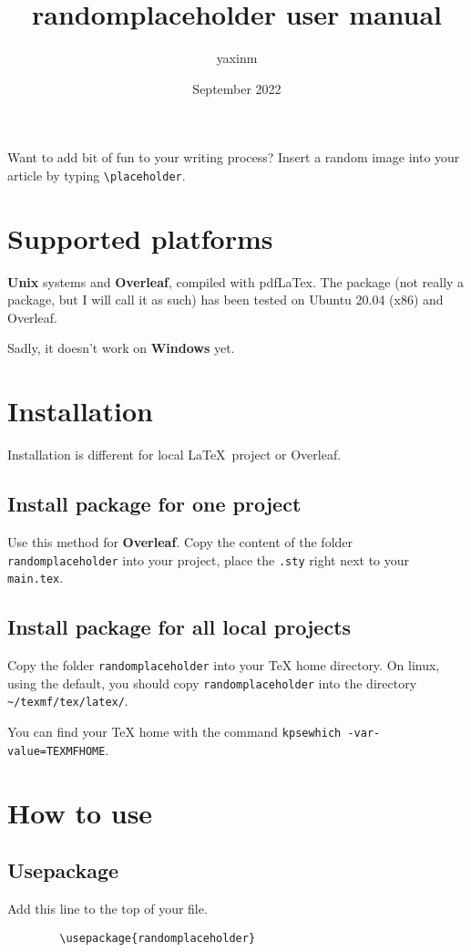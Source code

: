 \documentclass[12pt]{article}
\title{randomplaceholder user manual}
\author{yaxinm}
\date{September 2022}
\begin{document}
    \maketitle
    Want to add bit of fun to your writing process?
    Insert a random image into your article by typing \lstinline{\placeholder}. 
    \section{Supported platforms}
    \textbf{Unix} systems and \textbf{Overleaf}, compiled with pdfLaTex. 
    The package (not really a package, but I will call it as such) 
    has been tested on Ubuntu 20.04 (x86) and Overleaf.

    Sadly, it doesn't work on \textbf{Windows} yet.

    \section{Installation}
    Installation is different for local \LaTeX~project or Overleaf.

    \subsection{Install package for one project}
    Use this method for \textbf{Overleaf}.
    Copy the content of the folder \lstinline{randomplaceholder} into your project, place the \lstinline{.sty} right next to your \lstinline{main.tex}. 
    
    \subsection{Install package for all local projects}
    Copy the folder \lstinline{randomplaceholder} into your TeX home directory. On linux, using the default, you should copy \lstinline{randomplaceholder} into the directory \lstinline{~/texmf/tex/latex/}.

    You can find your TeX home with the command \lstinline{kpsewhich -var-value=TEXMFHOME}.



    \section{How to use}

    \subsection{Usepackage}
    Add this line to the top of your file.
    \begin{lstlisting}
        \usepackage{randomplaceholder}
    \end{lstlisting}
\end{document}
